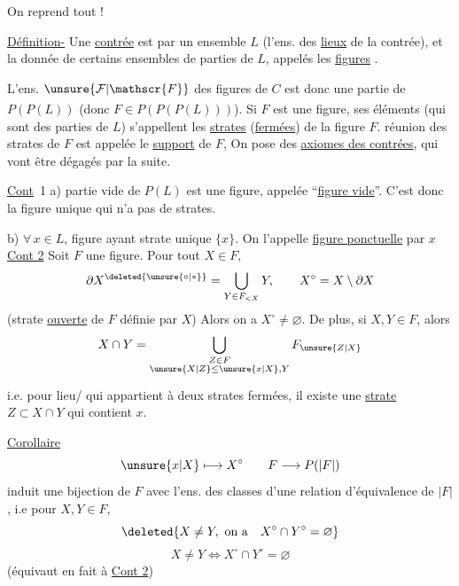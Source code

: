 On reprend tout !

\uline{Définition-} Une \uline{contrée}  est  par un ensemble $L$ (l'ens. des \uline{lieux} de la contrée), et la donnée de certains ensembles de parties de $L$, appelés les \uline{figures} .

L'ens. $\unsure{\mathcal{F}|\mathscr{F}}$ des figures de $C$ est donc une  partie de $P(P(L))$ (donc $F\in P(P(P(L)))$). Si $F$ est une figure, ses éléments\textsuperscript{\unsure{$\times$/}} (qui sont des parties de $L$) s'appellent les \uline{strates} (\uline{fermées}) de la figure $F$.  réunion des strates  de $F$ est appelée le \uline{support} de $F$,  On pose des \uline{axiomes des contrées}, qui vont être dégagés par la suite.

\uline{Cont}~1 \quad a)  partie vide de $P(L)$ est une  figure, appelée ``\uline{figure vide}''. C'est donc la figure unique qui n'a pas de strates.

\margin{$\big\Vert$}
b) $\forall\,x\in L$,  figure ayant  strate unique $\{x\}$. On l'appelle \uline{figure ponctuelle}  par $x$
\uline{Cont 2} \quad Soit $F$ une figure.  Pour tout $X\in F$,  
\[
\partial X^{\deleted{\unsure{\circ|*}}}=\bigcup_{Y\in F_{<X}}Y,\qquad X^\circ=X\setminus\partial X
\]
(strate \uline{ouverte} de $F$ définie par $X$) Alors on a $\boxed{X^\circ\ne\varnothing}$. De plus, si $X,Y\in F$, alors
\[
X\cap Y=\bigcup_{\substack{Z\in F\\\unsure{X|Z}\leq\unsure{x|X},Y}}F_{\unsure{Z|X}}
\]
i.e.  pour   lieu\textsuperscript{}/ qui appartient à deux strates fermées,  il existe une \uline{strate} $Z\subset X\cap Y$   qui contient $x$.

\uline{Corollaire}  
\[
\unsure{x|X}\longmapsto X^\circ\qquad F\longrightarrow P(|F|)
\]
induit une bijection de $F$ avec l'ens. des classes d'une relation d'équivalence de $|F|$, i.e pour $X,Y\in F$,  
\[
\deleted{X\ne Y,\ \text{on a}\quad X^\circ\cap Y^\circ=\varnothing}
\]
\[
X\ne Y\iff X^\circ\cap Y^\circ=\varnothing
\]
(équivaut en fait à \uline{Cont 2})

